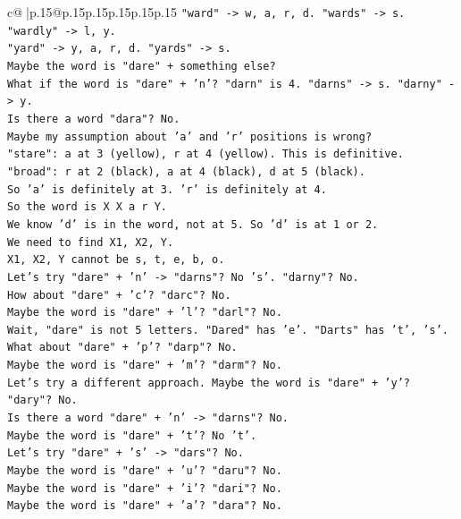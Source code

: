 \documentclass{article}
\begin{document}
{\begin{supertabular}{c@{$\;$}|p{.15\linewidth}@{}p{.15\linewidth}p{.15\linewidth}p{.15\linewidth}p{.15\linewidth}p{.15\linewidth}}
{{{\texttt{"ward" {-}> w, a, r, d. "wards" {-}> s. "wardly" {-}> l, y.} \\
\texttt{"yard" {-}> y, a, r, d. "yards" {-}> s.} \\
\texttt{Maybe the word is "dare" + something else?} \\
\texttt{What if the word is "dare" + 'n'? "darn" is 4. "darns" {-}> s. "darny" {-}> y.} \\
\texttt{Is there a word "dara"? No.} \\
\texttt{Maybe my assumption about 'a' and 'r' positions is wrong?} \\
\texttt{"stare": a at 3 (yellow), r at 4 (yellow). This is definitive.} \\
\texttt{"broad": r at 2 (black), a at 4 (black), d at 5 (black).} \\
\texttt{So 'a' is definitely at 3. 'r' is definitely at 4.} \\
\texttt{So the word is X X a r Y.} \\
\texttt{We know 'd' is in the word, not at 5. So 'd' is at 1 or 2.} \\
\texttt{We need to find X1, X2, Y.} \\
\texttt{X1, X2, Y cannot be s, t, e, b, o.} \\
\texttt{Let's try "dare" + 'n' {-}> "darns"? No 's'. "darny"? No.} \\
\texttt{How about "dare" + 'c'? "darc"? No.} \\
\texttt{Maybe the word is "dare" + 'l'? "darl"? No.} \\
\texttt{Wait, "dare" is not 5 letters. "Dared" has 'e'. "Darts" has 't', 's'.} \\
\texttt{What about "dare" + 'p'? "darp"? No.} \\
\texttt{Maybe the word is "dare" + 'm'? "darm"? No.} \\
\texttt{Let's try a different approach. Maybe the word is "dare" + 'y'? "dary"? No.} \\
\texttt{Is there a word "dare" + 'n' {-}> "darns"? No.} \\
\texttt{Maybe the word is "dare" + 't'? No 't'.} \\
\texttt{Let's try "dare" + 's' {-}> "dars"? No.} \\
\texttt{Maybe the word is "dare" + 'u'? "daru"? No.} \\
\texttt{Maybe the word is "dare" + 'i'? "dari"? No.} \\
\texttt{Maybe the word is "dare" + 'a'? "dara"? No.} \\
}}}
\end{supertabular}}
\end{document}
